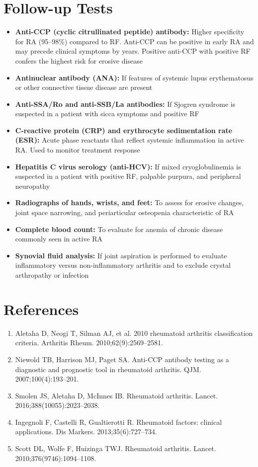 \section*{Follow-up Tests}
\begin{itemize}
  \item \textbf{Anti-CCP (cyclic citrullinated peptide) antibody:} Higher specificity for RA (95--98\%) compared to RF. Anti-CCP can be positive in early RA and may precede clinical symptoms by years. Positive anti-CCP with positive RF confers the highest risk for erosive disease
  \item \textbf{Antinuclear antibody (ANA):} If features of systemic lupus erythematosus or other connective tissue disease are present
  \item \textbf{Anti-SSA/Ro and anti-SSB/La antibodies:} If Sjogren syndrome is suspected in a patient with sicca symptoms and positive RF
  \item \textbf{C-reactive protein (CRP) and erythrocyte sedimentation rate (ESR):} Acute phase reactants that reflect systemic inflammation in active RA. Used to monitor treatment response
  \item \textbf{Hepatitis C virus serology (anti-HCV):} If mixed cryoglobulinemia is suspected in a patient with positive RF, palpable purpura, and peripheral neuropathy
  \item \textbf{Radiographs of hands, wrists, and feet:} To assess for erosive changes, joint space narrowing, and periarticular osteopenia characteristic of RA
  \item \textbf{Complete blood count:} To evaluate for anemia of chronic disease commonly seen in active RA
  \item \textbf{Synovial fluid analysis:} If joint aspiration is performed to evaluate inflammatory versus non-inflammatory arthritis and to exclude crystal arthropathy or infection
\end{itemize}

\section*{References}
\begin{enumerate}
  \item Aletaha D, Neogi T, Silman AJ, et al. 2010 rheumatoid arthritis classification criteria. Arthritis Rheum. 2010;62(9):2569--2581.
  \item Niewold TB, Harrison MJ, Paget SA. Anti-CCP antibody testing as a diagnostic and prognostic tool in rheumatoid arthritis. QJM. 2007;100(4):193--201.
  \item Smolen JS, Aletaha D, McInnes IB. Rheumatoid arthritis. Lancet. 2016;388(10055):2023--2038.
  \item Ingegnoli F, Castelli R, Gualtierotti R. Rheumatoid factors: clinical applications. Dis Markers. 2013;35(6):727--734.
  \item Scott DL, Wolfe F, Huizinga TWJ. Rheumatoid arthritis. Lancet. 2010;376(9746):1094--1108.
\end{enumerate}

\clearpage
